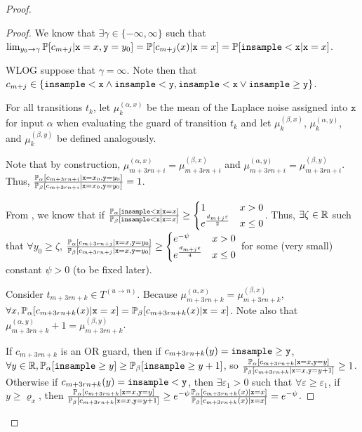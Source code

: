 \begin{proof}
\begin{proof}
		We know that $\exists \gamma \in \{-\infty, \infty\}$ such that $\lim_{y_0\to\gamma}\PP[c_{m+j}|\texttt{x}=x,\texttt{y}=y_0] = \PP[c_{m+j}(x)|\texttt{x}=x]=\PP[\lguard[\texttt{x}]|\texttt{x}=x]$.
		
		WLOG suppose that $\gamma = \infty$. Note then that $c_{m+j}\in \{\lguard[\texttt{x}]\land \lguard[\texttt{y}], \lguard[\texttt{x}]\lor \gguard[\texttt{y}]\}$.
		
		For all transitions $t_k$, let $\mu_k^{(\alpha, x)}$ be the mean of the Laplace noise assigned into $\texttt{x}$ for input $\alpha$ when evaluating the guard of transition $t_k$ and let $\mu_k^{(\beta, x)}$, $\mu_k^{(\alpha, y)}$, and $\mu_k^{(\beta, y)}$ be defined analogously. 

		Note that by construction, $\mu_{m+3rn+i}^{(\alpha, x)}=\mu_{m+3rn+i}^{(\beta, x)}$ and $\mu_{m+3rn+i}^{(\alpha, y)}=\mu_{m+3rn+i}^{(\beta, y)}$. Thus, $\frac{\PP_\alpha[c_{m+3rn+i}|\texttt{x}=x_0, \texttt{y}=y_0]}{\PP_\beta[c_{m+3rn+i}|\texttt{x}=x_0, \texttt{y}=y_0]}=1$.

		From \cite{chadhaLinearTimeDecidability2021}, we know that if $\frac{\PP_\alpha[\lguard[\texttt{x}]|\texttt{x} = x]}{\PP_\beta[\lguard[\texttt{x}]|\texttt{x} = x]}\geq \begin{cases}
			1 & x > 0\\
			e^{\frac{d_{m+j}\varepsilon}{2}} & x\leq 0
		\end{cases}$. Thus, $\exists \zeta\in \RR$ such that $\forall y_0\geq \zeta$, $\frac{\PP_\alpha[c_{m+3rn+j}|\texttt{x} = x, \texttt{y} = y_0]}{\PP_\beta[c_{m+3rn+j}|\texttt{x} = x, \texttt{y} = y_0]}\geq \begin{cases}
			e^{-\psi} & x > 0\\
			e^{\frac{d_{m+j}\varepsilon}{4}} & x\leq 0
		\end{cases}$ for some (very small) constant $\psi>0$ (to be fixed later).

		Consider $t_{m+3rn+k}\in T^{(u\to n)}$. Because $\mu_{m+3rn+k}^{(\alpha, x)}=\mu_{m+3rn+k}^{(\beta, x)}$, $\forall x, \PP_\alpha[c_{m+3rn+k}(x)|\texttt{x}=x]=\PP_\beta[c_{m+3rn+k}(x)|\texttt{x}=x]$. Note also that $\mu_{m+3rn+k}^{(\alpha, y)}+1=\mu_{m+3rn+k}^{(\beta, y)}$. 
		
		If $c_{m+3rn+k}$ is an OR guard, then if $c_{m+3rn+k}(y)=\gguard[\texttt{y}]$, $\forall y\in \RR, \PP_\alpha[\gguard[y]]\geq\PP_\beta[\gguard[y+1]]$, so $\frac{\PP_\alpha[c_{m+3rn+k}|\texttt{x}=x, \texttt{y}=y]}{\PP_\beta[c_{m+3rn+k}|\texttt{x}=x, \texttt{y}=y+1]}\geq 1$. 
		Otherwise if $c_{m+3rn+k}(y)=\lguard[\texttt{y}]$, then $\exists \varepsilon_1>0$ such that $\forall \varepsilon\geq \varepsilon_1$, if $y\geq \varrho_x$, then $\frac{\PP_\alpha[c_{m+3rn+k}|\texttt{x}=x, \texttt{y}=y]}{\PP_\beta[c_{m+3rn+k}|\texttt{x}=x, \texttt{y}=y+1]}\geq e^{-\psi}\frac{\PP_\alpha[c_{m+3rn+k}(x)|\texttt{x}=x]}{\PP_\beta[c_{m+3rn+k}(x)|\texttt{x}=x]}=e^{-\psi}$. 


\end{proof}
\end{proof}
